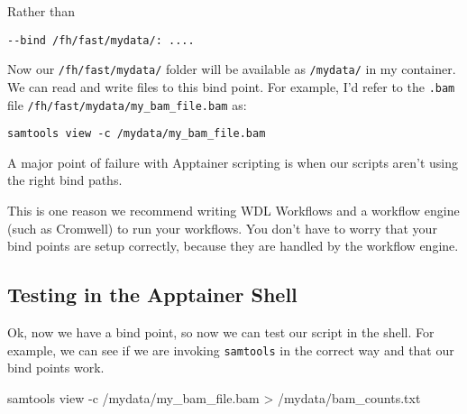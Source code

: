 \documentclass[
  letterpaper,
  DIV=11,
  numbers=noendperiod]{scrreprt}
\newenvironment{Shaded}{\begin{snugshade}}{\end{snugshade}}
\newcommand{\AttributeTok}[1]{\textcolor[rgb]{0.40,0.45,0.13}{#1}}
\newcommand{\ExtensionTok}[1]{\textcolor[rgb]{0.00,0.23,0.31}{#1}}
\newcommand{\NormalTok}[1]{\textcolor[rgb]{0.00,0.23,0.31}{#1}}
\newcommand{\OperatorTok}[1]{\textcolor[rgb]{0.37,0.37,0.37}{#1}}
\begin{document}
Rather than

\begin{verbatim}
--bind /fh/fast/mydata/: ....
\end{verbatim}

Now our \texttt{/fh/fast/mydata/} folder will be available as
\texttt{/mydata/} in my container. We can read and write files to this
bind point. For example, I'd refer to the \texttt{.bam} file
\texttt{/fh/fast/mydata/my\_bam\_file.bam} as:

\begin{verbatim}
samtools view -c /mydata/my_bam_file.bam
\end{verbatim}

\begin{tcolorbox}[enhanced jigsaw, colbacktitle=quarto-callout-note-color!10!white, left=2mm, toprule=.15mm, toptitle=1mm, opacityback=0, bottomrule=.15mm, breakable, leftrule=.75mm, colframe=quarto-callout-note-color-frame, bottomtitle=1mm, titlerule=0mm, coltitle=black, title=\textcolor{quarto-callout-note-color}{\faInfo}\hspace{0.5em}{WDL makes this way easier}, rightrule=.15mm, arc=.35mm, opacitybacktitle=0.6, colback=white]

A major point of failure with Apptainer scripting is when our scripts
aren't using the right bind paths.

This is one reason we recommend writing WDL Workflows and a workflow
engine (such as Cromwell) to run your workflows. You don't have to worry
that your bind points are setup correctly, because they are handled by
the workflow engine.

\end{tcolorbox}

\subsection{Testing in the Apptainer
Shell}\label{testing-in-the-apptainer-shell}

Ok, now we have a bind point, so now we can test our script in the
shell. For example, we can see if we are invoking \texttt{samtools} in
the correct way and that our bind points work.

\begin{Shaded}
\begin{Highlighting}[]
\ExtensionTok{samtools}\NormalTok{ view }\AttributeTok{{-}c}\NormalTok{ /mydata/my\_bam\_file.bam }\OperatorTok{\textgreater{}}\NormalTok{ /mydata/bam\_counts.txt}
\end{Highlighting}
\end{Shaded}
\end{document}
